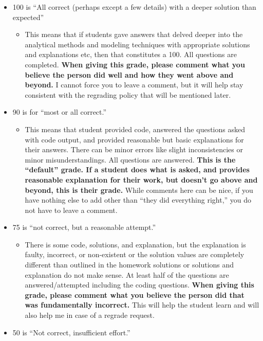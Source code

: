 \documentclass[
]{book}
\providecommand{\tightlist}{%
  \setlength{\itemsep}{0pt}\setlength{\parskip}{0pt}}
\begin{document}
\begin{itemize}
\tightlist
\item
  100 is ``All correct (perhaps except a few details) with a deeper solution than expected''

  \begin{itemize}
  \tightlist
  \item
    This means that if students gave answers that delved deeper into the analytical methods and modeling techniques with appropriate solutions and explanations etc, then that constitutes a 100. All questions are completed. \textbf{When giving this grade, please comment what you believe the person did well and how they went above and beyond.} I cannot force you to leave a comment, but it will help stay consistent with the regrading policy that will be mentioned later.
  \end{itemize}
\item
  90 is for ``most or all correct.''

  \begin{itemize}
  \tightlist
  \item
    This means that student provided code, answered the questions asked with code output, and provided reasonable but basic explanations for their answers. There can be minor errors like slight inconsistencies or minor misunderstandings. All questions are answered. \textbf{This is the ``default'' grade. If a student does what is asked, and provides reasonable explanation for their work, but doesn't go above and beyond, this is their grade.} While comments here can be nice, if you have nothing else to add other than ``they did everything right,'' you do not have to leave a comment.
  \end{itemize}
\item
  75 is ``not correct, but a reasonable attempt.''

  \begin{itemize}
  \tightlist
  \item
    There is some code, solutions, and explanation, but the explanation is faulty, incorrect, or non-existent or the solution values are completely different than outlined in the homework solutions or solutions and explanation do not make sense. At least half of the questions are answered/attempted including the coding questions. \textbf{When giving this grade, please comment what you believe the person did that was fundamentally incorrect.} This will help the student learn and will also help me in case of a regrade request.
  \end{itemize}
\item
  50 is ``Not correct, insufficient effort.''


\end{itemize}
\end{document}
